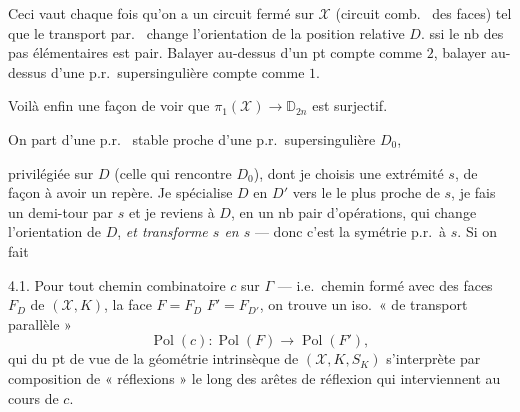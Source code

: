 \documentclass[11pt,a4paper]{article}
\begin{document}
Ceci vaut chaque fois qu'on a un circuit fermé sur $\mathcal{X}$ (circuit comb.\ \ill{} des faces) tel que le transport par.\  change l'orientation de la position relative $D$.   ssi le nb des pas élémentaires est pair. Balayer au-dessus d'un pt compte comme $2$, balayer au-dessus d'une p.r.\ supersingulière compte comme $1$.

Voilà enfin une façon de voir que $\pi_1(\mathcal{X}) \to \mathbb{D}_{2n}$ est surjectif.

On part d'une p.r.\  stable proche d'une p.r.\ supersingulière $D_0$,

   privilégiée  sur $D$ (celle qui rencontre $D_0$), dont je choisis une extrémité $s$, de façon à avoir un repère. Je spécialise $D$ en $D'$ vers le    le plus proche de $s$, je fais un demi-tour par $s$ et je reviens à $D$, en un nb pair d'opérations, qui change l'orientation de $D$, \emph{et transforme $s$ en $s$} --- donc c'est la symétrie p.r.\ à $s$. Si on fait

4.1. Pour tout \struck{\ill{}} chemin combinatoire $c$ sur $\Gamma$ --- i.e.\ chemin formé avec des faces $F_D$ de $(\mathcal{X}, K)$,  la face $F = F_D$  $F' = F_{D'}$, on trouve un iso.\ « de transport parallèle »
\[
\operatorname{Pol}(c) : \operatorname{Pol}(F) \longrightarrow \operatorname{Pol}(F'),
\]
qui du pt de vue de la géométrie intrinsèque de $(\mathcal{X}, K, S_K)$ s'interprète par composition  de « réflexions » le long des arêtes de réflexion qui interviennent au cours de $c$.
\end{document}
